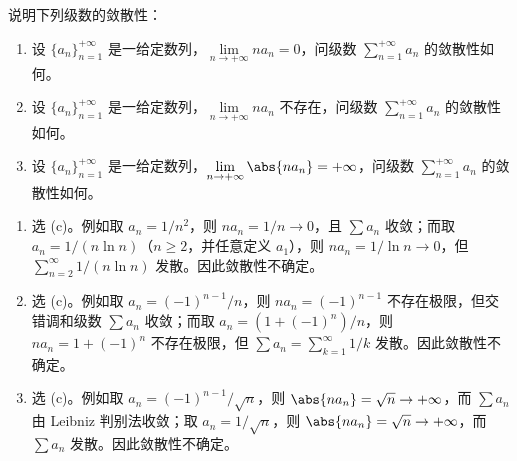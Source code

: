 
\begin{question}[数项级数敛散性的判断]

说明下列级数的敛散性：
\begin{enumerate}
\item 设 $\{a_n\}_{n=1}^{+\infty}$ 是一给定数列，$\lim\limits_{n\to+\infty} n a_n=0$，问级数 $\sum\limits_{n=1}^{+\infty}a_n$ 的敛散性如何。

\item 设 $\{a_n\}_{n=1}^{+\infty}$ 是一给定数列，$\lim\limits_{n\to+\infty} n a_n$ 不存在，问级数 $\sum\limits_{n=1}^{+\infty}a_n$ 的敛散性如何。

\item 设 $\{a_n\}_{n=1}^{+\infty}$ 是一给定数列，$\lim\limits_{n\to+\infty}\abs{n a_n}=+\infty$，问级数 $\sum\limits_{n=1}^{+\infty}a_n$ 的敛散性如何。
\end{enumerate}

\begin{solution}

\begin{enumerate}
\item 选 (c)。例如取 $a_n=1/n^2$，则 $n a_n=1/n\to0$，且 $\sum a_n$ 收敛；而取 $a_n=1/(n\ln n)$（$n\ge2$，并任意定义 $a_1$），则 $n a_n=1/\ln n\to0$，但 $\sum_{n=2}^{\infty}1/(n\ln n)$ 发散。因此敛散性不确定。

\item 选 (c)。例如取 $a_n=(-1)^{n-1}/n$，则 $n a_n=(-1)^{n-1}$ 不存在极限，但交错调和级数 $\sum a_n$ 收敛；而取 $a_n=(1+(-1)^n)/n$，则 $n a_n=1+(-1)^n$ 不存在极限，但 $\sum a_n=\sum_{k=1}^{\infty}1/k$ 发散。因此敛散性不确定。

\item 选 (c)。例如取 $a_n=(-1)^{n-1}/\sqrt n$，则 $\abs{n a_n}=\sqrt n\to+\infty$，而 $\sum a_n$ 由 Leibniz 判别法收敛；取 $a_n=1/\sqrt n$，则 $\abs{n a_n}=\sqrt n\to+\infty$，而 $\sum a_n$ 发散。因此敛散性不确定。
\end{enumerate}

\end{solution}
\end{question}

